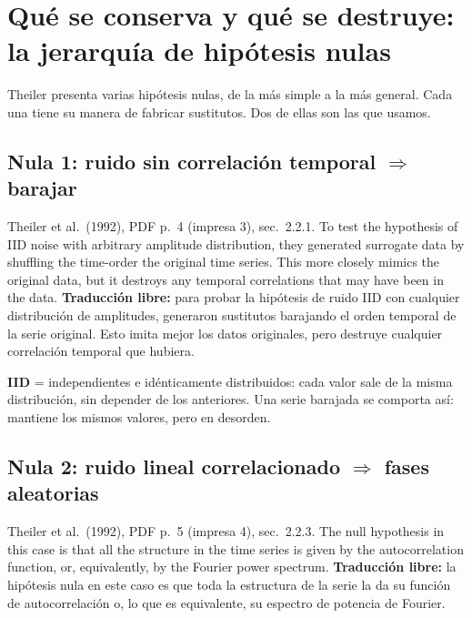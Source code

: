 \documentclass[11pt,openany]{book}
\begin{document}
\section{Qué se conserva y qué se destruye: la jerarquía de hipótesis nulas}

Theiler presenta varias hipótesis nulas, de la más simple a la más general. Cada una tiene su manera de fabricar sustitutos. Dos de ellas son las que usamos.

\subsection*{Nula 1: ruido sin correlación temporal $\Rightarrow$ barajar}

\begin{cita}{Theiler et al.\ (1992), PDF p.~4 (impresa 3), sec.~2.2.1.}
To test the hypothesis of IID noise with arbitrary amplitude distribution, they generated surrogate data by shuffling the time-order the original time series. This more closely mimics the original data, but it destroys any temporal correlations that may have been in the data.
\tcblower
\textbf{Traducción libre:} para probar la hipótesis de ruido IID con cualquier distribución de amplitudes, generaron sustitutos barajando el orden temporal de la serie original. Esto imita mejor los datos originales, pero destruye cualquier correlación temporal que hubiera.
\end{cita}

\begin{nota}
\textbf{IID} = independientes e idénticamente distribuidos: cada valor sale de la misma distribución, sin depender de los anteriores. Una serie barajada se comporta así: mantiene los mismos valores, pero en desorden.
\end{nota}

\subsection*{Nula 2: ruido lineal correlacionado $\Rightarrow$ fases aleatorias}

\begin{cita}{Theiler et al.\ (1992), PDF p.~5 (impresa 4), sec.~2.2.3.}
The null hypothesis in this case is that all the structure in the time series is given by the autocorrelation function, or, equivalently, by the Fourier power spectrum.
\tcblower
\textbf{Traducción libre:} la hipótesis nula en este caso es que toda la estructura de la serie la da su función de autocorrelación o, lo que es equivalente, su espectro de potencia de Fourier.
\end{cita}
\end{document}
